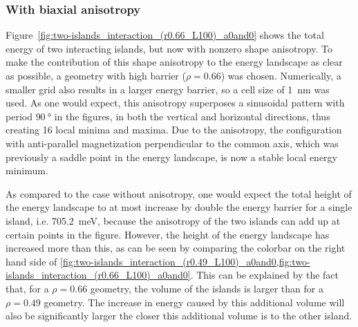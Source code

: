 \documentclass[11pt,a4paper,english,twoside]{article}
\begin{document}
\subsubsection{With biaxial anisotropy}
Figure~\ref{fig:two-islands_interaction_(r0.66_L100)_a0and0} shows the total energy of two interacting islands, but now with nonzero shape anisotropy. To make the contribution of this shape anisotropy to the energy landscape as clear as possible, a geometry with high barrier ($\rho=0.66$) was chosen. Numerically, a smaller grid also results in a larger energy barrier, so a cell size of \SI{1}{\nano\metre} was used. As one would expect, this anisotropy superposes a sinusoidal pattern with period $\SI{90}{\degree}$ in the figures, in both the vertical and horizontal directions, thus creating 16 local minima and maxima. Due to the anisotropy, the configuration with anti-parallel magnetization perpendicular to the common axis, which was previously a saddle point in the energy landscape, is now a stable local energy minimum. \par
As compared to the case without anisotropy, one would expect the total height of the energy landscape to at most increase by double the energy barrier for a single island, i.e. \SI{705.2}{\milli\electronvolt}, because the anisotropy of the two islands can add up at certain points in the figure. However, the height of the energy landscape has increased more than this, as can be seen by comparing the colorbar on the right hand side of \cref{fig:two-islands_interaction_(r0.49_L100)_a0and0,fig:two-islands_interaction_(r0.66_L100)_a0and0}. This can be explained by the fact that, for a $\rho=0.66$ geometry, the volume of the islands is larger than for a $\rho=0.49$ geometry. The increase in energy caused by this additional volume will also be significantly larger the closer this additional volume is to the other island. \par
\end{document}
